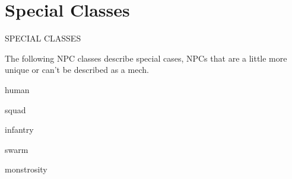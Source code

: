 \section{Special Classes}
      SPECIAL CLASSES

The following NPC classes describe special cases, NPCs that are a little more unique or can’t be
described as a mech.

{human}

{squad}

{infantry}

{swarm}

{monstrosity}